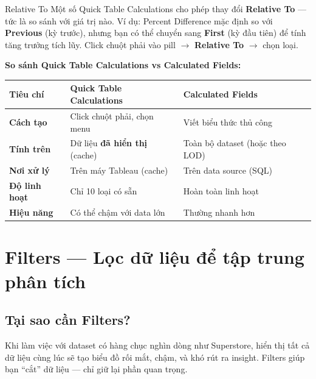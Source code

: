 \documentclass[12pt]{article}
\begin{document}
\begin{guidelinebox}{Relative To}
Một số Quick Table Calculations cho phép thay đổi \textbf{Relative To} --- tức là so sánh với giá trị nào. Ví dụ: Percent Difference mặc định so với \textbf{Previous} (kỳ trước), nhưng bạn có thể chuyển sang \textbf{First} (kỳ đầu tiên) để tính tăng trưởng tích lũy. Click chuột phải vào pill $\rightarrow$ \textbf{Relative To} $\rightarrow$ chọn loại.
\end{guidelinebox}

\noindent \textbf{So sánh Quick Table Calculations vs Calculated Fields:}

\begin{center}
\renewcommand{\arraystretch}{1.4}
\begin{tabularx}{\linewidth}{l X X}
\toprule
\textbf{Tiêu chí} & \textbf{Quick Table Calculations} & \textbf{Calculated Fields} \\
\midrule
\textbf{Cách tạo} & Click chuột phải, chọn menu & Viết biểu thức thủ công \\
\textbf{Tính trên} & Dữ liệu \textbf{đã hiển thị} (cache) & Toàn bộ dataset (hoặc theo LOD) \\
\textbf{Nơi xử lý} & Trên máy Tableau (cache) & Trên data source (SQL) \\
\textbf{Độ linh hoạt} & Chỉ 10 loại có sẵn & Hoàn toàn linh hoạt \\
\textbf{Hiệu năng} & Có thể chậm với data lớn & Thường nhanh hơn \\
\bottomrule
\end{tabularx}
\end{center}



\newpage
\section{Filters --- Lọc dữ liệu để tập trung phân tích}
\label{section:filters}

\subsection{Tại sao cần Filters?}

\noindent Khi làm việc với dataset có hàng chục nghìn dòng như Superstore, hiển thị tất cả dữ liệu cùng lúc sẽ tạo biểu đồ rối mắt, chậm, và khó rút ra insight. Filters giúp bạn ``cắt'' dữ liệu --- chỉ giữ lại phần quan trọng.
\end{document}
